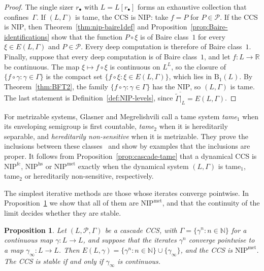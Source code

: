 \documentclass[psamsfonts]{amsart}
\newtheorem{prop}[thm]{Proposition}
\theoremstyle{definition}
\theoremstyle{remark}
\newcommand{\NIP}{\text{NIP}}
\numberwithin{equation}{section}
\begin{document}
\begin{proof}
The single sizer $r_\bullet$ with $L=L[r_\bullet]$ forms an exhaustive
collection that confines~$\Gamma$.
If $(L,\Gamma)$ is tame, the CCS is $\NIP$: take $f=P$ for $P\in\mathcal{P}$.
If the CCS is $\NIP$, then Theorem~\ref{thm:nip-baire1def} and
Proposition~\ref{prop:Baire-identifications} show that the function $P\circ \xi$ is of Baire
class~$1$ for every $\xi\in E(L,\Gamma)$ and $P\in\mathcal{P}$.
Every deep computation is therefore of Baire class~$1$.
Finally, suppose that every deep computation is of Baire class~$1$, and let
$f\colon L\to\mathbb{R}$ be continuous.
The map $\xi\mapsto f\circ \xi$ is continuous on $L^L$, so the closure of
$\{f\circ\gamma:\gamma\in\Gamma\}$ is the compact set
$\{f\circ \xi:\xi\in E(L,\Gamma)\}$, which lies in $\mathrm{B}_1(L)$.
By Theorem~\ref{thm:BFT2}, the family $\{f\circ\gamma:\gamma\in\Gamma\}$ has the
$\NIP$, so $(L,\Gamma)$ is tame.
The last statement is Definition~\ref{def:NIP-levels}, since
$\overline{\tilde\Gamma|_{L}}=E(L,\Gamma)$.
\end{proof}

For metrizable systems, Glasner and Megrelishvili call a tame system \emph{tame$_1$} when its enveloping semigroup is first countable, \emph{tame$_2$} when it is hereditarily separable, and \emph{hereditarily non-sensitive} when it is metrizable.
They prove the inclusions between these classes~\cite[Proposition~0.6]{glasner2022tame} and show by examples that the inclusions are proper.
It follows from Proposition~\ref{prop:cascade-tame} that a dynamical CCS is $\NIP^{\mathrm{fc}}$, $\NIP^{\mathrm{hs}}$ or $\NIP^{\mathrm{met}}$ exactly when the dynamical system $(L,\Gamma)$ is tame$_1$, tame$_2$ or hereditarily non-sensitive, respectively.

The simplest iterative methods are those whose iterates converge pointwise.
In Proposition~\ref{prop:convergent} we show that all of them are $\NIP^{\mathrm{met}}$, and that the continuity of the limit decides whether they are stable.

\begin{prop}\label{prop:convergent}
Let $(L,\mathcal{P},\Gamma)$ be a cascade CCS, with $\Gamma=\{\gamma^n:n\in\mathbb{N}\}$ for a continuous map $\gamma\colon L\to L$, and suppose that the iterates $\gamma^n$
converge pointwise to a map $\gamma_\infty\colon L\to L$.
Then $E(L,\gamma)=\{\gamma^n:n\in\mathbb{N}\}\cup\{\gamma_\infty\}$, and the CCS is
$\NIP^{\mathrm{met}}$.
The CCS is stable if and only if $\gamma_\infty$ is continuous.
\end{prop}
\end{document}
